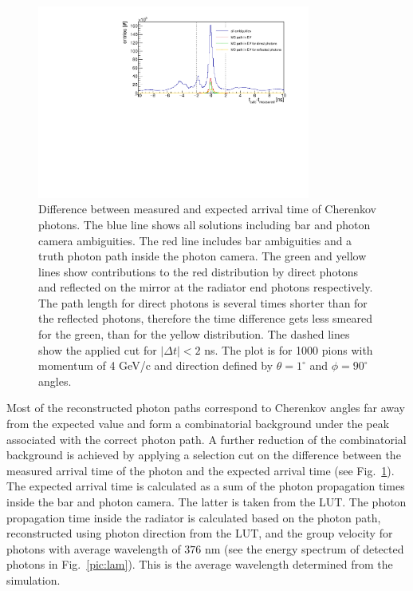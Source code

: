 \begin{figure}[!h]
\centering
\includegraphics[width=0.8\textwidth]{pics/hDiff.pdf}
\caption{\label{pic:dtime}
Difference between measured and expected arrival time of Cherenkov photons. The blue line shows all solutions including bar and photon camera ambiguities. The red line includes bar ambiguities and a truth photon path inside the photon camera. The green and yellow lines show contributions to the red distribution by direct photons and reflected on the mirror at the radiator end photons respectively. The path length for direct photons is several times shorter than for the reflected photons, therefore the time difference gets less smeared for the green, than for the yellow distribution. The dashed lines show the applied cut for $|\Delta t| < 2$ ns. The plot is for 1000 pions with momentum of 4 GeV/c and direction defined by $\theta = 1^{\circ}$ and $\phi = 90^{\circ}$ angles.
}
\end{figure}

Most of the reconstructed photon paths correspond to Cherenkov angles far away from the expected value and form a combinatorial background under the peak associated with the correct photon path. A further reduction of the combinatorial background is achieved by applying a selection cut on the difference between the measured arrival time of the photon and the expected arrival time (see Fig.~\ref{pic:dtime}). The expected arrival time is calculated as a sum of the photon propagation times inside the bar and photon camera. The latter is taken from the LUT. The photon propagation time inside the radiator is calculated based on the photon path, reconstructed using photon direction from the LUT, and the group velocity for photons with average wavelength of $376$ nm (see the energy spectrum of detected photons in Fig.~\ref{pic:lam}). This is the average wavelength determined from the simulation.

